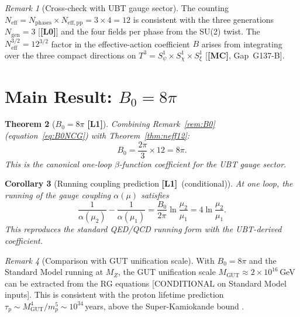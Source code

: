 \documentclass[12pt,a4paper]{article}
\newtheorem{theorem}{Theorem}[section]
\newtheorem{corollary}[theorem]{Corollary}
\theoremstyle{definition}
\theoremstyle{remark}
\newtheorem{remark}[theorem]{Remark}
\newcommand{\Lone}{\textbf{[L1]}}
\newcommand{\Lzero}{\textbf{[L0]}}
\newcommand{\MC}{\textbf{[MC]}}
\newcommand{\Neff}{N_{\mathrm{eff}}}
\begin{document}
\begin{remark}[Cross-check with UBT gauge sector]
The counting $\Neff = N_{\mathrm{phases}} \times N_{\mathrm{eff,pp}} = 3 \times 4 = 12$
is consistent with the three generations $N_{\mathrm{gen}} = 3$ [\Lzero] and
the four fields per phase from the SU(2) twist.
The $N_{\mathrm{eff}}^{3/2} = 12^{3/2}$ factor in the
effective-action coefficient $B$ arises from integrating over the three
compact directions on $T^3 = S^1_\psi \times S^1_\chi \times S^1_\xi$ [\MC,
Gap~G137-B].
\end{remark}

\section{Main Result: $B_0 = 8\pi$}
\label{sec:result}

\begin{theorem}[$B_0 = 8\pi$ \Lone]
\label{thm:B0}
Combining Remark~\ref{rem:B0} (equation~\eqref{eq:B0NCG}) with
Theorem~\ref{thm:neff12}:
\begin{equation}
\boxed{B_0 = \frac{2\pi}{3}\times 12 = 8\pi.}
\label{eq:B0_result}
\end{equation}
This is the canonical one-loop $\beta$-function coefficient for the
UBT gauge sector.
\end{theorem}

\begin{corollary}[Running coupling prediction \Lone\ (conditional)]
At one loop, the running of the gauge coupling $\alpha(\mu)$ satisfies
\[
\frac{1}{\alpha(\mu_2)} - \frac{1}{\alpha(\mu_1)}
= \frac{B_0}{2\pi}\ln\frac{\mu_2}{\mu_1}
= 4\ln\frac{\mu_2}{\mu_1}.
\]
This reproduces the standard QED/QCD running form with the UBT-derived
coefficient.
\end{corollary}

\begin{remark}[Comparison with GUT unification scale]
With $B_0 = 8\pi$ and the Standard Model running at $M_Z$,
the GUT unification scale $M_{\mathrm{GUT}} \approx 2\times 10^{16}$\,GeV
can be extracted from the RG equations [CONDITIONAL on Standard Model inputs].
This is consistent with the proton lifetime prediction
$\tau_p \sim M_{\mathrm{GUT}}^4/m_p^5 \sim 10^{34}$\,years,
above the Super-Kamiokande bound \cite{superk2020}.
\end{remark}
\end{document}
